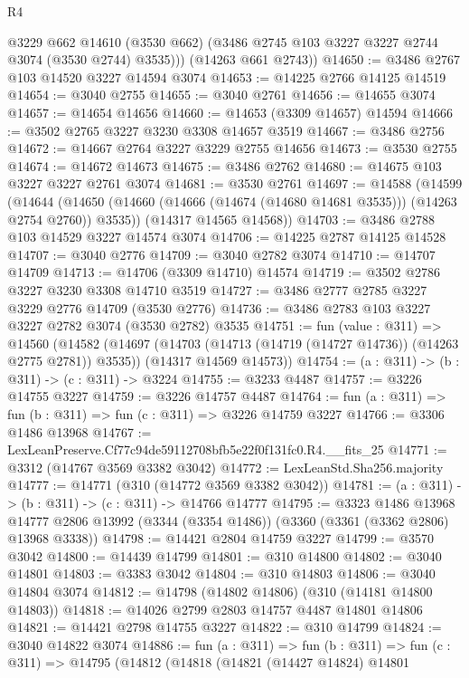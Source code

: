 \begin{lexlean}{R4}
\begin{coremodule}
          @3229
          @662
          @14610
          (@3530 @662)
          (@3486 @2745 @103 @3227 @3227 @2744 @3074 (@3530 @2744) @3535)))
      (@14263 @661 @2743))
@14650 := @3486 @2767 @103 @14520 @3227 @14594 @3074
@14653 := @14225 @2766 @14125 @14519
@14654 := @3040 @2755
@14655 := @3040 @2761
@14656 := @14655 @3074
@14657 := @14654 @14656
@14660 := @14653 (@3309 @14657) @14594
@14666 := @3502 @2765 @3227 @3230 @3308 @14657 @3519
@14667 := @3486 @2756
@14672 := @14667 @2764 @3227 @3229 @2755 @14656
@14673 := @3530 @2755
@14674 := @14672 @14673
@14675 := @3486 @2762
@14680 := @14675 @103 @3227 @3227 @2761 @3074
@14681 := @3530 @2761
@14697 := @14588
    (@14599
      (@14644 (@14650 (@14660 (@14666 (@14674 (@14680 @14681 @3535))) (@14263 @2754 @2760)) @3535))
      (@14317 @14565 @14568))
@14703 := @3486 @2788 @103 @14529 @3227 @14574 @3074
@14706 := @14225 @2787 @14125 @14528
@14707 := @3040 @2776
@14709 := @3040 @2782 @3074
@14710 := @14707 @14709
@14713 := @14706 (@3309 @14710) @14574
@14719 := @3502 @2786 @3227 @3230 @3308 @14710 @3519
@14727 := @3486 @2777 @2785 @3227 @3229 @2776 @14709 (@3530 @2776)
@14736 := @3486 @2783 @103 @3227 @3227 @2782 @3074 (@3530 @2782) @3535
@14751 := fun (value : @311) =>
  @14560
    (@14582
      (@14697 (@14703 (@14713 (@14719 (@14727 @14736)) (@14263 @2775 @2781)) @3535))
      (@14317 @14569 @14573))
@14754 := (a : @311) -> (b : @311) -> (c : @311) -> @3224
@14755 := @3233 @4487
@14757 := @3226 @14755 @3227
@14759 := @3226 @14757 @4487
@14764 := fun (a : @311) => fun (b : @311) => fun (c : @311) => @3226 @14759 @3227
@14766 := @3306 @1486 @13968
@14767 := LexLeanPreserve.Cf77c94de59112708bfb5e22f0f131fc0.R4.__fits_25
@14771 := @3312 (@14767 @3569 @3382 @3042)
@14772 := LexLeanStd.Sha256.majority
@14777 := @14771 (@310 (@14772 @3569 @3382 @3042))
@14781 := (a : @311) -> (b : @311) -> (c : @311) -> @14766 @14777
@14795 := @3323
    @1486
    @13968
    @14777
    @2806
    @13992
    (@3344 (@3354 @1486))
    (@3360 (@3361 (@3362 @2806) @13968 @3338))
@14798 := @14421 @2804 @14759 @3227
@14799 := @3570 @3042
@14800 := @14439 @14799
@14801 := @310 @14800
@14802 := @3040 @14801
@14803 := @3383 @3042
@14804 := @310 @14803
@14806 := @3040 @14804 @3074
@14812 := @14798 (@14802 @14806) (@310 (@14181 @14800 @14803))
@14818 := @14026 @2799 @2803 @14757 @4487 @14801 @14806
@14821 := @14421 @2798 @14755 @3227
@14822 := @310 @14799
@14824 := @3040 @14822 @3074
@14886 := fun (a : @311) =>
  fun (b : @311) =>
  fun (c : @311) =>
  @14795
    (@14812
      (@14818
        (@14821
          (@14427 @14824)
          @14801

\end{coremodule}
\end{lexlean}

